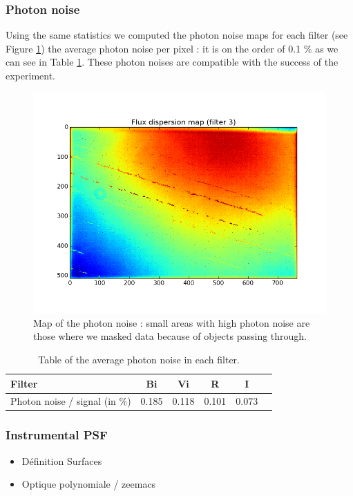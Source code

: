 \documentclass[\docopts]{\docclass}
\begin{document}
\subsubsection{Photon noise}
\label{subsec:photon_noise}
Using the same statistics we computed the photon noise maps for each
filter (see Figure \ref{fig:photon_noise}) the average photon noise
per pixel : it is on the order of 0.1 \% as we can see in Table
\ref{tab:photon_noise}. These photon noises are compatible with the
success of the experiment.
\begin{figure}[ht]
  \centering
  \includegraphics[width=0.90\linewidth]{master_flat_3_var.png}
  \caption{Map of the photon noise : small areas with high photon
    noise are those where we masked data because of objects passing
    through.}
  \label{fig:photon_noise}
\end{figure}

\begin{table}
  \centering
  \caption{Table of the average photon noise in each filter.}
  \begin{tabular}{lccccc}
    \hline
    \hline
    Filter & Bi & Vi & R & I \\
    \hline
    Photon noise / signal (in \%) & 0.185 & 0.118  & 0.101 & 0.073 \\
    \hline
  \end{tabular}

  \label{tab:photon_noise}
\end{table} 

\subsubsection{Instrumental PSF}
\label{sec:PSF}
\begin{itemize}
\item Définition Surfaces
\item Optique polynomiale / zeemacs
\end{itemize}
\end{document}
